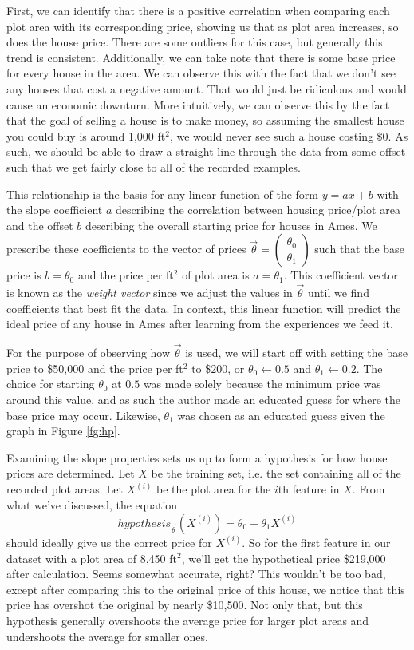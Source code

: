 First, we can identify that there is a positive correlation when comparing each
plot area with its corresponding price, showing us that as plot area increases,
so does the house price. There are some outliers for this case, but generally
this trend is consistent. Additionally, we can take note that there is some
base price for every house in the area. We can observe this with the fact that
we don't see any houses that cost a negative amount. That would just be
ridiculous and would cause an economic downturn. More intuitively, we can
observe this by the fact that the goal of selling a house is to make money, so
assuming the smallest house you could buy is around 1,000 ft$^2$, we would
never see such a house costing \$0. As such, we should be able to draw a
straight line through the data from some offset such that we get fairly close
to all of the recorded examples.

This relationship is the basis for any linear function of the form $y=ax + b$
with the slope coefficient $a$ describing the correlation between housing
price/plot area and the offset $b$ describing the overall starting price for
houses in Ames. We prescribe these coefficients to the vector of prices $\vec\theta
= \begin{pmatrix}\theta_0 \\ \theta_1\end{pmatrix}$ such that the base price is
$b = \theta_0$ and the price per ft$^2$ of plot area is $a=\theta_1$. This
coefficient vector is known as the \emph{weight vector} since we adjust the
values in $\vec\theta$ until we find coefficients that best fit the data. In
context, this linear function will predict the ideal price of any house in
Ames after learning from the experiences we feed it. 

For the purpose of observing how $\vec\theta$ is used, we will start off with setting the base price to \$50,000 and the price per ft$^2$ to \$200, or $\theta_0 \leftarrow 0.5$ and $\theta_1 \leftarrow 0.2$. The choice for starting $\theta_0$ at $0.5$ was made solely because the minimum price was around this value, and as such the author made an educated guess for where the base price may occur. Likewise, $\theta_1$ was chosen as an educated guess given the graph in Figure \ref{fg:hp}. 

Examining the slope properties sets us up to form a hypothesis for how house prices
are determined. Let $X$ be the training set, i.e. the set containing all of the
recorded plot areas. Let $X^{(i)}$ be the plot area for the $i$th feature in
$X$. From what we've discussed, the equation
\begin{equation}
    hypothesis_{\vec\theta}(X^{(i)}) = \theta_0 + \theta_1X^{(i)} 
\end{equation}
should ideally give us the correct price for $X^{(i)}$. So for the first feature in our dataset with a plot area of 8,450 ft$^2$, we'll get the hypothetical price \$219,000 after calculation. Seems somewhat accurate, right?  This wouldn't be too bad, except after comparing this to the original price of this house, we notice that this price has overshot the original by nearly \$10,500. Not only that, but this hypothesis generally overshoots the average price for larger plot areas and undershoots the average for smaller ones. 

